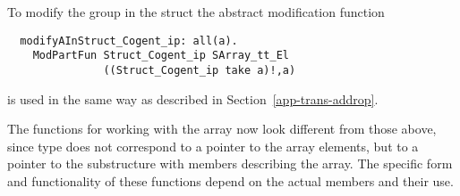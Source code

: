 To modify the group in the struct the abstract modification function 
\begin{verbatim}
  modifyAInStruct_Cogent_ip: all(a). 
    ModPartFun Struct_Cogent_ip SArray_tt_El 
               ((Struct_Cogent_ip take a)!,a)
\end{verbatim}
is used in the same way as described in Section~\ref{app-trans-addrop}.

The functions for working with the array now look different from those above, since type 
does not correspond to a pointer to the array elements, but to a pointer to the substructure with members describing
the array. The specific form and functionality of these functions depend on the actual members and their use.

